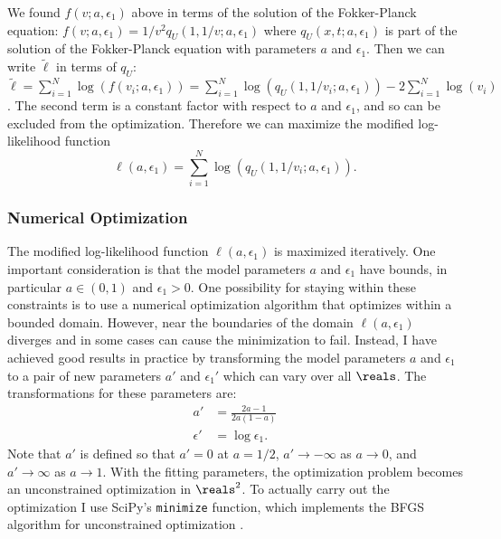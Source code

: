 We found $f(v; a, \epsilon_1)$ above in terms of the solution of the
Fokker-Planck equation:
$f(v; a, \epsilon_1) = 1/v^2 q_U(1, 1/v; a, \epsilon_1)$ where
$q_U(x, t; a, \epsilon_1)$ is part of the solution of the
Fokker-Planck equation with parameters $a$ and $\epsilon_1$. Then we
can write $\tilde{\ell}$ in terms of $q_U$:
$\tilde{\ell} = \sum_{i=1}^N \log(f(v_i; a, \epsilon_1)) =
\sum_{i=1}^N \log(q_U(1, 1/v_i; a, \epsilon_1)) - 2\sum_{i=1}^N
\log(v_i)$. The second term is a constant factor with respect to $a$
and $\epsilon_1$, and so can be excluded from the
optimization. Therefore we can maximize the modified log-likelihood
function
\begin{equation}
  \label{eq:mod-log-like}
  \ell(a, \epsilon_1) = \sum_{i=1}^N \log(q_U(1, 1/v_i; a, \epsilon_1)). 
\end{equation}

\subsubsection{Numerical Optimization}
\label{sec:numer-optim}

The modified log-likelihood function $\ell(a, \epsilon_1)$ is maximized
iteratively. One important consideration is that the model parameters
$a$ and $\epsilon_1$ have bounds, in particular $a \in (0, 1)$ and
$\epsilon_1 > 0$. One possibility for staying within these constraints
is to use a numerical optimization algorithm that optimizes within a
bounded domain. However, near the boundaries of the domain
$\ell(a, \epsilon_1)$ diverges and in some cases can cause the
minimization to fail. Instead, I have achieved good results in
practice by transforming the model parameters $a$ and $\epsilon_1$ to a
pair of new parameters $a'$ and $\epsilon_1'$ which can vary over all
$\reals$. The transformations for these parameters are:
\begin{align}
  \label{eq:a-fwd-trns}
  a' &= \frac{2a - 1}{2a(1 - a)} \\
  \label{eq:e-fwd-trns}
  \epsilon' &= \log \epsilon_1.
\end{align}
Note that $a'$ is defined so that $a'=0$ at $a=1/2$,
$a' \rightarrow -\infty$ as $a \rightarrow 0$, and
$a' \rightarrow \infty$ as $a \rightarrow 1$. With the fitting
parameters, the optimization problem becomes an unconstrained
optimization in $\reals^2$. To actually carry out the optimization I
use SciPy's \cite{Virtanen2020} \verb|minimize| function, which
implements the BFGS algorithm for unconstrained optimization
\cite{Nocedal2006}.

